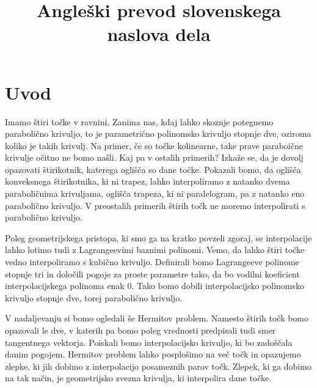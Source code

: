 \documentclass[mat1]{fmfdelo}
\title{Angleški prevod slovenskega naslova dela}
\begin{document}

\section{Uvod}

Imamo štiri točke v ravnini. Zanima nas, kdaj lahko skoznje potegnemo parabolično krivuljo, to je parametrično polinomsko krivuljo stopnje dve, oziroma koliko je takih krivulj. Na primer, če so točke kolinearne, take prave paraboične krivulje očitno ne bomo našli. Kaj pa v ostalih primerih? Izkaže se, da je dovolj opazovati štirikotnik, katerega oglišča so dane točke. Pokazali bomo, da oglišča konveksnega štirikotnika, ki ni trapez, lahko interpoliramo z natanko dvema paraboličnima krivuljama, oglišča trapeza, ki ni paralelogram, pa z natanko eno parabolično krivuljo. V preostalih primerih štirih točk ne moremo interpolirati s parabolično krivuljo.


Poleg geometrijskega pristopa, ki smo ga na kratko povzeli zgoraj, se interpolacije lahko lotimo tudi z Lagrangeevimi baznimi polinomi. Vemo, da lahko štiri točke vedno interpoliramo s kubično krivuljo. Definirali bomo Lagrangeeve polinome stopnje tri in določili pogoje za proste parametre tako, da bo vodilni koeficient interpolacijskega polinoma enak $0$. Tako bomo dobili interpolacijsko polinomsko krivuljo stopnje dve, torej parabolično krivuljo.


V nadaljevanju si bomo ogledali še Hermitov problem. Namesto štirih točk bomo opazovali le dve, v katerih pa bomo poleg vrednosti predpisali tudi smer tangentnega vektorja. Poiskali bomo interpolacijsko krivuljo, ki bo zadoščala danim pogojem. Hermitov problem lahko posplošimo na več točk in opazujemo zlepke, ki jih dobimo z interpolacijo posameznih parov točk. Zlepek, ki ga dobimo na tak način, je geometrijsko zvezna krivulja, ki interpolira dane točke. 

\end{document}
